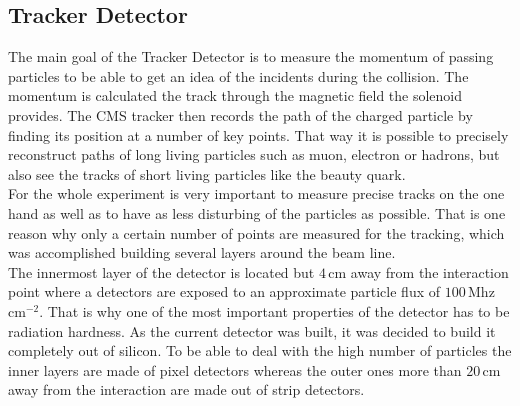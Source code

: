 \documentclass[british,11pt,a4paper]{memoir}
\begin{document}
\subsection{Tracker Detector}
The main goal of the Tracker Detector is to measure the momentum of passing particles to be able to get an idea of the incidents during the collision. The momentum is calculated the track through the magnetic field the solenoid provides. The \ac{CMS} tracker then records the path of the charged particle by finding its position at a number of key points. That way it is possible to precisely reconstruct paths of long living particles such as muon, electron or hadrons, but also see the tracks of short living particles like the beauty quark.\\
For the whole experiment is very important to measure precise tracks on the one hand as well as to have as less disturbing of the particles as possible. That is one reason why only a certain number of points are measured for the tracking, which was accomplished building several layers around the beam line.\\
The innermost layer of the detector is located but $4\,$cm away from the interaction point where a detectors are exposed to an approximate particle flux of $100\,$Mhz\,cm$^{-2}$. That is why one of the most important properties of the detector has to be radiation hardness. As the current detector was built, it was decided to build it completely out of silicon. To be able to deal with the high number of particles the inner layers are made of pixel detectors whereas the outer ones more than $20\,$cm away from the interaction are made out of strip detectors.
\end{document}
